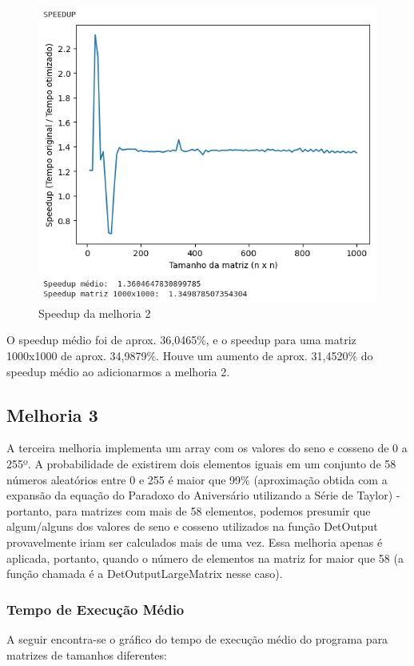 \begin{figure}[!ht]
	\centering	
	\caption[\hspace{0.1cm}Speedup da melhoria 2]{Speedup da melhoria 2}
	  \vspace{-0.4cm}
	\includegraphics[width=.8\textwidth]{figuras/speedup_melhoria2.png}
\end{figure}

O speedup médio foi de aprox. 36,0465\%, e o speedup para uma matriz 1000x1000 de aprox. 34,9879\%. Houve um aumento de aprox. 31,4520\% do speedup médio ao adicionarmos a melhoria 2.

\subsection{\esp Melhoria 3}
A terceira melhoria implementa um array com os valores do seno e cosseno de 0 a 255º. A probabilidade de existirem dois elementos iguais em um conjunto de 58 números aleatórios entre 0 e 255 é maior que 99\% (aproximação obtida com a expansão da equação do Paradoxo do Aniversário utilizando a Série de Taylor) - portanto, para matrizes com mais de 58 elementos, podemos presumir que algum/alguns dos valores de seno e cosseno utilizados na função DetOutput provavelmente iriam ser calculados mais de uma vez. Essa melhoria apenas é aplicada, portanto, quando o número de elementos na matriz for maior que 58 (a função chamada é a DetOutputLargeMatrix nesse caso).

\newpage

\subsubsection{\esp Tempo de Execução Médio}
A seguir encontra-se o gráfico do tempo de execução médio do programa para matrizes de tamanhos diferentes: 

